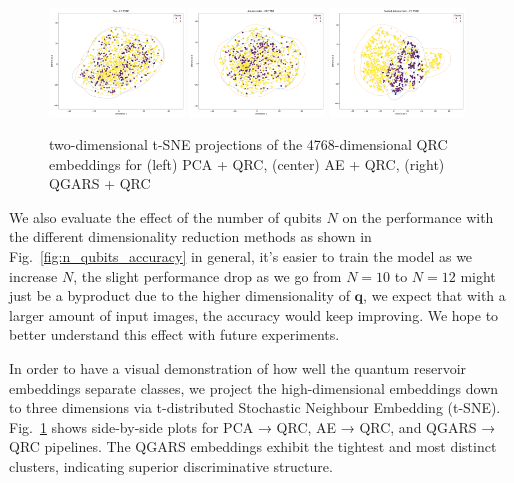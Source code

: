 \documentclass[conference]{IEEEtran}
\begin{document}
\begin{figure}[!ht]
  \centering
  \includegraphics[width=0.32\textwidth]{images/results/generated_polyp_dataset/quantum_embeddings_2d_tsne_PCA.pdf}
  \includegraphics[width=0.32\textwidth]{images/results/generated_polyp_dataset/quantum_embeddings_2d_tsne_autoencoder.pdf}
  \includegraphics[width=0.32\textwidth]{images/results/generated_polyp_dataset/quantum_embeddings_2d_tsne_guided_autoencoder.pdf}
  \caption{two-dimensional t-SNE projections of the 4768-dimensional QRC embeddings for (left) PCA + QRC, (center) AE + QRC, (right) QGARS + QRC}
  \label{fig:embeddings_tsne}
\end{figure}

We also evaluate the effect of the number of qubits $N$ on the performance with the different dimensionality reduction methods as shown in Fig.~\ref{fig:n_qubits_accuracy} in general, it's easier to train the model as we increase $N$, the slight performance drop as we go from $N = 10$ to $N = 12$ might just be a byproduct due to the higher dimensionality of $\bm q$, we expect that with a larger amount of input images, the accuracy would keep improving. We hope to better understand this effect with future experiments.



In order to have a visual demonstration of how well the quantum reservoir embeddings separate classes, we project the high-dimensional embeddings down to three dimensions via t-distributed Stochastic Neighbour Embedding (t-SNE). Fig.~\ref{fig:embeddings_tsne} shows side-by-side plots for PCA → QRC, AE → QRC, and QGARS → QRC pipelines. The QGARS embeddings exhibit the tightest and most distinct clusters, indicating superior discriminative structure.
\end{document}
